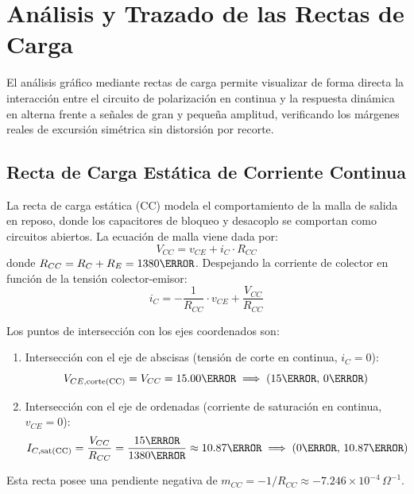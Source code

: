\chapter{Análisis y Trazado de las Rectas de Carga}
\label{chap:rectas_de_carga}

El análisis gráfico mediante rectas de carga permite visualizar de forma directa la interacción entre el circuito de
polarización en continua y la respuesta dinámica en alterna frente a señales de gran y pequeña amplitud, verificando
los márgenes reales de excursión simétrica sin distorsión por recorte.

\section{Recta de Carga Estática de Corriente Continua}

La recta de carga estática (CC) modela el comportamiento de la malla de salida en reposo, donde los capacitores de
bloqueo y desacoplo se comportan como circuitos abiertos. La ecuación de malla viene dada por:
\begin{equation}
  V_{CC} = v_{CE} + i_C \cdot R_{CC}
\end{equation}
donde $R_{CC} = R_C + R_E = 1380\ohm$. Despejando la corriente de colector en función de la tensión colector-emisor:
\begin{equation}
  i_C = -\frac{1}{R_{CC}} \cdot v_{CE} + \frac{V_{CC}}{R_{CC}}
  \label{eq:recta_cc}
\end{equation}

Los puntos de intersección con los ejes coordenados son:
\begin{enumerate}
  \item Intersección con el eje de abscisas (tensión de corte en continua, $i_C = 0$):
    \begin{equation}
      V_{CE,\text{corte(CC)}} = V_{CC} = 15.00\V \implies (15\V,\, 0\mA)
    \end{equation}
  \item Intersección con el eje de ordenadas (corriente de saturación en continua, $v_{CE} = 0$):
    \begin{equation}
      I_{C,\text{sat(CC)}} = \frac{V_{CC}}{R_{CC}} = \frac{15\V}{1380\ohm} \approx 10.87\mA \implies (0\V,\, 10.87\mA)
    \end{equation}
\end{enumerate}

Esta recta posee una pendiente negativa de $m_{CC} = -1/R_{CC} \approx -7.246 \times 10^{-4}\,\Omega^{-1}$.

